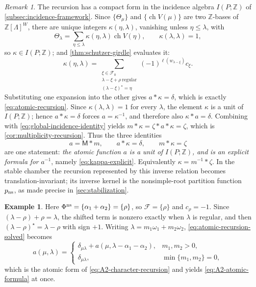 \documentclass[11pt]{article}
\theoremstyle{definition}
\newtheorem{example}[example]{Example}
\theoremstyle{remark}
\newtheorem{remark}[remark]{Remark}
\newcommand{\Raiz}{\Phi}
\newcommand{\Pesos}{\Lambda}
\newcommand{\Weyl}{W}
\newcommand{\chr}{\operatorname{ch}}
\newcommand{\Mu}{\mathsf{M}}
\newcommand{\Z}{\mathbb Z}
\begin{document}
\begin{remark}\label{rem:kappa-inverse}
The recursion has a compact form in the incidence algebra $I(P;\Z)$ of
\cref{subsec:incidence-framework}.  Since $\{\Theta_\mu\}$ and
$\{\chr V(\mu)\}$ are two $\Z$-bases of $\Z[\Pesos]^\Weyl$, there are unique
integers $\kappa(\eta,\lambda)$, vanishing unless $\eta\le\lambda$, with
\[
   \Theta_\lambda=\sum_{\eta\le\lambda}\kappa(\eta,\lambda)\chr V(\eta),
   \qquad \kappa(\lambda,\lambda)=1 ,
\]
so $\kappa\in I(P;\Z)$; and \cref{thm:schutzer-girdle} evaluates it:
\begin{equation}\label{eq:kappa-explicit}
   \kappa(\eta,\lambda)
     =\sum_{\substack{\xi\in\mathcal F_0\\
                      \lambda-\xi+\rho\ \text{regular}\\
                      (\lambda-\xi)^\star=\eta}}
        (-1)^{\ell(w_{\lambda-\xi})}c_\xi .
\end{equation}
Substituting one expansion into the other gives $a*\kappa=\delta$, which is
exactly \eqref{eq:atomic-recursion}.  Since $\kappa(\lambda,\lambda)=1$ for
every $\lambda$, the element $\kappa$ is a unit of $I(P;\Z)$; hence
$a*\kappa=\delta$ forces $a=\kappa^{-1}$, and therefore also
$\kappa*a=\delta$.  Combining with \eqref{eq:global-incidence-identity}
yields $m*\kappa=\zeta*a*\kappa=\zeta$, which is
\cref{cor:multiplicity-recursion}.  Thus the three identities
\[
   a=\Mu*m,
   \qquad
   a*\kappa=\delta,
   \qquad
   m*\kappa=\zeta
\]
are one statement: \emph{the atomic function $a$ is a unit of $I(P;\Z)$, and
\cite[Theorem~2.1]{Schutzer} is an explicit formula for $a^{-1}$}, namely
\eqref{eq:kappa-explicit}.  Equivalently $\kappa=m^{-1}*\zeta$.  In the stable
chamber the recursion represented by this inverse relation becomes
translation-invariant; its inverse kernel is the nonsimple-root partition
function $p_{\rm ns}$, as made precise in \cref{sec:stabilization}.
\end{remark}

\begin{example}\label{ex:A2-recursion}
Here $\Raiz^{\rm ns}=\{\alpha_1+\alpha_2\}=\{\rho\}$, so
$\mathcal F=\{\rho\}$ and $c_\rho=-1$.  Since
$(\lambda-\rho)+\rho=\lambda$, the shifted term is nonzero exactly when
$\lambda$ is regular, and then $(\lambda-\rho)^\star=\lambda-\rho$ with sign
$+1$.  Writing $\lambda=m_1\omega_1+m_2\omega_2$,
\eqref{eq:atomic-recursion-solved} becomes
\[
   a(\mu,\lambda)=
   \begin{cases}
     \delta_{\mu\lambda}+a(\mu,\lambda-\alpha_1-\alpha_2),&m_1,m_2>0,\\
     \delta_{\mu\lambda},&\min\{m_1,m_2\}=0,
   \end{cases}
\]
which is the atomic form of \eqref{eq:A2-character-recursion} and yields
\eqref{eq:A2-atomic-formula} at once.
\end{example}
\end{document}
